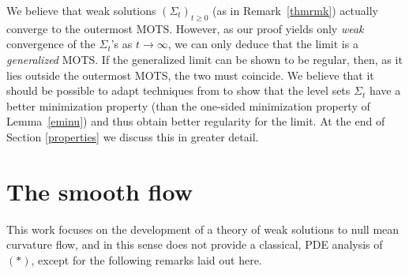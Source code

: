 \documentclass[11pt]{amsart}
\newtheorem{Theorem}{Theorem}
\begin{document}

 We believe that weak solutions $(\Sigma_t)_{t\ge0}$ (as in Remark~\ref{thmrmk}) actually  converge to the outermost MOTS. However, as our proof yields only {\it weak} convergence of the $\Sigma_t$'s as $t\to \infty$, we can only deduce that the limit is a {\it generalized} MOTS. If the generalized limit can be shown to be regular, then, as it lies outside the outermost MOTS,  the two must coincide. 
 We believe that it should be possible to adapt techniques from \cite{W00} to show that the level sets $\Sigma_t$ have a better minimization property (than the one-sided minimization property of Lemma~\ref{eminu}) and thus obtain better regularity for the limit. At the end of Section \ref{properties} we discuss this  in greater detail.




\section{The smooth flow}
\noindent This work focuses on the development of a theory of weak solutions to null mean curvature flow, and in this sense does not provide a classical, PDE analysis of $(*)$, except for the following remarks laid out here.
\end{document}
